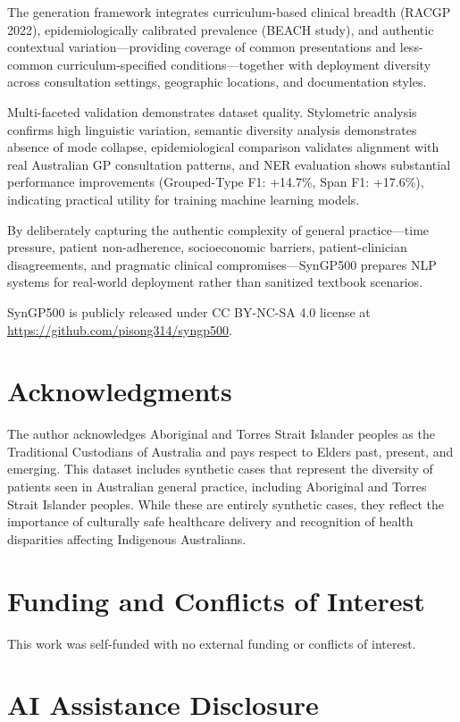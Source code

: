 \documentclass[11pt]{article}
\begin{document}
The generation framework integrates curriculum-based clinical breadth (RACGP 2022), epidemiologically calibrated prevalence (BEACH study), and authentic contextual variation—providing coverage of common presentations and less-common curriculum-specified conditions—together with deployment diversity across consultation settings, geographic locations, and documentation styles.

Multi-faceted validation demonstrates dataset quality. Stylometric analysis confirms high linguistic variation, semantic diversity analysis demonstrates absence of mode collapse, epidemiological comparison validates alignment with real Australian GP consultation patterns, and NER evaluation shows substantial performance improvements (Grouped-Type F1: +14.7\%, Span F1: +17.6\%), indicating practical utility for training machine learning models.

By deliberately capturing the authentic complexity of general practice—time pressure, patient non-adherence, socioeconomic barriers, patient-clinician disagreements, and pragmatic clinical compromises—SynGP500 prepares NLP systems for real-world deployment rather than sanitized textbook scenarios.

SynGP500 is publicly released under CC BY-NC-SA 4.0 license at \url{https://github.com/pisong314/syngp500}.

\section*{Acknowledgments}

The author acknowledges Aboriginal and Torres Strait Islander peoples as the Traditional Custodians of Australia and pays respect to Elders past, present, and emerging. This dataset includes synthetic cases that represent the diversity of patients seen in Australian general practice, including Aboriginal and Torres Strait Islander peoples. While these are entirely synthetic cases, they reflect the importance of culturally safe healthcare delivery and recognition of health disparities affecting Indigenous Australians.

\section*{Funding and Conflicts of Interest}

This work was self-funded with no external funding or conflicts of interest.

\section*{AI Assistance Disclosure}
\end{document}
